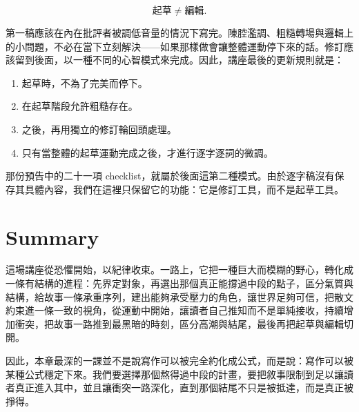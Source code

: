 \begin{equation}
\text{起草} \neq \text{編輯}.
\end{equation}

第一稿應該在內在批評者被調低音量的情況下寫完。陳腔濫調、粗糙轉場與邏輯上的小問題，不必在當下立刻解決——如果那樣做會讓整體運動停下來的話。修訂應該留到後面，以一種不同的心智模式來完成。因此，講座最後的更新規則就是：

\begin{enumerate}
\item 起草時，不為了完美而停下。
\item 在起草階段允許粗糙存在。
\item 之後，再用獨立的修訂輪回頭處理。
\item 只有當整體的起草運動完成之後，才進行逐字逐詞的微調。
\end{enumerate}

那份預告中的二十一項 checklist，就屬於後面這第二種模式。由於逐字稿沒有保存其具體內容，我們在這裡只保留它的功能：它是修訂工具，而不是起草工具。

\section{Summary}

這場講座從恐懼開始，以紀律收束。一路上，它把一種巨大而模糊的野心，轉化成一條有結構的進程：先界定對象，再選出那個真正能撐過中段的點子，區分氣質與結構，給故事一條承重序列，建出能夠承受壓力的角色，讓世界足夠可信，把散文約束進一條一致的視角，從運動中開始，讓讀者自己推知而不是單純接收，持續增加衝突，把故事一路推到最黑暗的時刻，區分高潮與結尾，最後再把起草與編輯切開。

因此，本章最深的一課並不是說寫作可以被完全約化成公式，而是說：寫作可以被某種公式穩定下來。我們要選擇那個熬得過中段的計畫，要把敘事限制到足以讓讀者真正進入其中，並且讓衝突一路深化，直到那個結尾不只是被抵達，而是真正被掙得。
